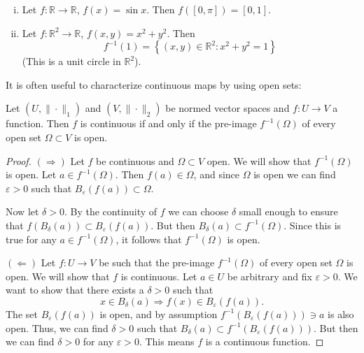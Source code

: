 \documentclass[10pt]{article}
\newcommand{\R}{\mathbb{R}}
\begin{document}
  \begin{example}
    \begin{enumerate}[(i)]
      \item Let $f:\R \rightarrow \R$, $f(x) = \sin x$. Then $f([0,\pi]) = [0,1]$.
      \item Let $f:\R^{2} \rightarrow \R$, $f(x,y) = x^{2}+y^{2}$. Then
      \[
        f^{-1}({1}) = \left\{(x,y) \in \R^{2}:x^{2}+y^{2} = 1\right\}
      \]
      (This is a unit circle in $\R^{2}$).
    \end{enumerate}
  \end{example}

  It is often useful to characterize continuous maps by using open sets:
  \begin{theorem}
    Let $(U,\|\cdot\|_{1})$ and $(V,\|\cdot\|_{2})$ be normed vector spaces and $f:U \rightarrow V$ a function. 
    Then $f$ is continuous if and only if the pre-image $f^{-1}(\Omega)$ of every open set $\Omega \subset V$ is open.
  \end{theorem}

  \begin{proof}
    $(\Rightarrow)$ Let $f$ be continuous and $\Omega \subset V$ open. We will show that $f^{-1}(\Omega)$ is open.
    Let $a \in f^{-1}(\Omega)$. Then $f(a) \in \Omega$, and since $\Omega$ is open we can find $\varepsilon > 0$
    such that $B_{\varepsilon}(f(a)) \subset \Omega$.

    Now let $\delta > 0$. By the continuity of $f$ we can choose $\delta$ small enough to ensure that $f(B_{\delta}(a)) \subset B_{\varepsilon}(f(a))$. But then $B_{\delta}(a) \subset f^{-1}(\Omega)$.
    Since this is true for any $a \in f^{-1}(\Omega)$, it follows that $f^{-1}(\Omega)$ is open.

    $(\Leftarrow)$ Let $f: U \rightarrow V$ be such that the pre-image $f^{-1}(\Omega)$ of every open set $\Omega$ is open.
    We will show that $f$ is continuous. Let $a \in U$ be arbitrary and fix $\varepsilon > 0$.
    We want to show that there exists a $\delta > 0$ such that
    \begin{equation}
      x \in B_{\delta}(a) \Rightarrow f(x) \in B_{\varepsilon}(f(a)).
    \end{equation}
    The set $B_{\varepsilon}(f(a))$ is open, and by assumption $f^{-1}(B_{\varepsilon}(f(a))) \ni a$ is also open.
    Thus, we can find $\delta > 0$ such that $B_{\delta}(a) \subset f^{-1}(B_{\varepsilon}(f(a)))$.
    But then we can find $\delta > 0$ for any $\varepsilon > 0$. This means $f$ is a continuous function.
  \end{proof}
\end{document}
